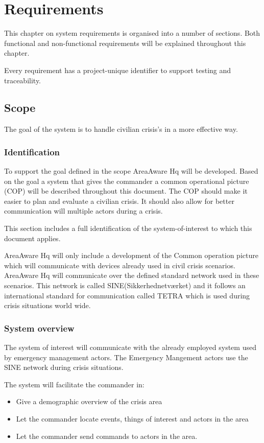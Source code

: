 \label{chp_requirements}
\chapter{Requirements}
This chapter on system requirements is organised into a number of sections. Both functional and non-functional requirements will be explained throughout this chapter.

Every requirement has a project-unique identifier to support testing and traceability.

\section{Scope}
The goal of the system is to handle civilian crisis's in a more effective way. 

\subsection{Identification}
To support the goal defined in the scope AreaAware Hq will be developed. Based on the goal a system that gives the commander a common operational picture (COP) will be described throughout this document. The COP should make it easier to plan and evaluate a civilian crisis. It should also allow for better communication will multiple actors during a crisis.

This section includes a full identification of the system-of-interest to which this document applies.

AreaAware Hq will only include a development of the Common operation picture which will communicate with devices already used in civil crisis scenarios. AreaAware Hq will communicate over the defined standard network used in these scenarios. This network is called SINE(Sikkerhednetværket) and it follows an international standard for communication called TETRA which is used during crisis situations world wide. 

\subsection{System overview}
The system of interest will communicate with the already employed system used by emergency management actors. The Emergency Mangement actors use the SINE network during crisis situations.

The system will facilitate the commander in:
\begin{itemize}
	\item Give a demographic overview of the crisis area
	\item Let the commander locate events, things of interest and actors in the area
	\item Let the commander send commands to actors in the area.
\end{itemize}

